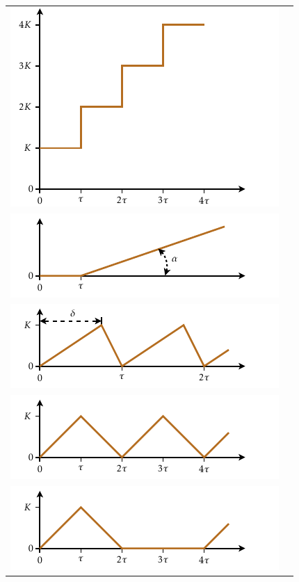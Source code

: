 \begin{longtable}{cc}
   \includegraphics{Imatges/Cap-Laplace-Funcio-5.pdf} & \raisebox{2.5cm}{$\dfrac{K}{s(1-\eu^{-\tau s})} =
   K\dfrac{1+\coth(\frac{\tau s}{2})}{2 s}$}\\[2.4ex]
   \includegraphics{Imatges/Cap-Laplace-Funcio-6.pdf} & \raisebox{0.8cm}{$\dfrac{\eu^{-\tau s}}{s^2}\tan\alpha$}\\[2.4ex]
   \includegraphics{Imatges/Cap-Laplace-Funcio-7.pdf} & \raisebox{0.8cm}{$K\dfrac{-1+\eu^{-\tau s}+\dfrac{\tau}{\delta}(1-\eu^{-\delta s})}{(\tau-\delta)s^2(1-\eu^{-\tau s})}$}\\[2.4ex]
   \includegraphics{Imatges/Cap-Laplace-Funcio-8.pdf} & \raisebox{0.8cm}{$K\dfrac{1-\eu^{-\tau s}}{\tau s^2(1+\eu^{-\tau s})} = \dfrac{K}{\tau s^2}\tanh\dfrac{\tau s}{2}$}\\[2.4ex]
   \includegraphics{Imatges/Cap-Laplace-Funcio-9.pdf} & \raisebox{0.8cm}{$K\dfrac{\eu^{-2\tau s}-2\eu^{-\tau s}+1}{\tau s^2(1-\eu^{-4\tau s})}$}\\[2.4ex]

\end{longtable}
